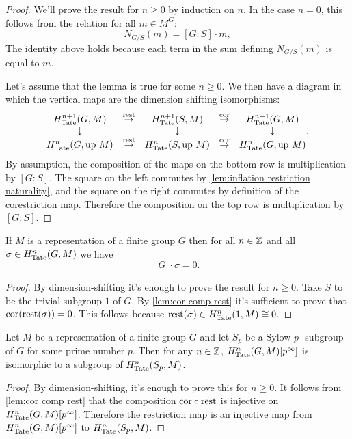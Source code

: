 \begin{proof}
	We'll prove the result for $n \ge 0$ by induction on $n$.
	In the case $n = 0$, this follows from the relation for all $m \in M^G$:
	\[
		N_{G/S} (m) = [G:S] \cdot m,
	\]
	The identity above holds because each term in the sum defining $N_{G/S}(m)$ is equal to $m$.

	Let's assume that the lemma is true for some $n \ge 0$.
	We then have a diagram in which the vertical maps are the dimension shifting isomorphisms:
	\[
		\begin{matrix}
			H^{n+1}_{\mathrm{Tate}}(G, M) & \stackrel{\mathrm{rest}}\to &
			H^{n+1}_{\mathrm{Tate}}(S,M) & \stackrel{\mathrm{cor}}\to & H^{n+1}_{\mathrm{Tate}}(G,M) \\
			\downarrow &&\downarrow &&\downarrow \\
			H^{n}_{\mathrm{Tate}}(G,\mathrm{up}\ M) &  \stackrel{\mathrm{rest}}\to &
			H^{n}_{\mathrm{Tate}}(S,\mathrm{up}\ M) &  \stackrel{\mathrm{cor}}\to & H^{n}_{\mathrm{Tate}}(G,\mathrm{up}\ M)
		\end{matrix}.
	\]
	By assumption, the composition of the maps on the bottom row is multiplication by $[G:S]$.
	The square on the left commutes by \ref{lem:inflation restriction naturality},
	and the square on the right commutes by definition of the corestriction map.
	Therefore the composition on the top row is multiplication by $[G:S]$.
\end{proof}


\begin{corollary} \label{cor:cohomology G-torsion}
	If $M$ is a representation of a finite group $G$ then for
	all $n \in {\mathbb Z}$ and all $\sigma \in H^n_{\mathrm{Tate}}(G,M)$ we have
	\[
		|G| \cdot \sigma = 0.
	\]
\end{corollary}

\begin{proof}
	By dimension-shifting it's enough to prove the result for $n \ge 0$.
	Take $S$ to be the trivial subgroup $1$ of $G$.
	By \ref{lem:cor comp rest} it's sufficient to prove that $\mathrm{cor}(\mathrm{rest}(\sigma))= 0$.
	This follows because $\mathrm{rest}(\sigma) \in H^n_{\mathrm{Tate}}(1,M) \cong 0$.
\end{proof}

\begin{corollary} \label{cor:cohomology sub Sylow}
	Let $M$ be a representation of a finite group $G$ and let $S_p$ be a Sylow $p$-
	subgroup of $G$ for some prime number $p$.
	Then for any $n \in {\mathbb Z}$, $H^n_{\mathrm{Tate}}(G,M)[p^\infty]$ is isomorphic to a subgroup
	of $H^n_{\mathrm{Tate}}(S_p,M)$.
\end{corollary}

\begin{proof}
	By dimension-shifting, it's enough to prove this for $n \ge 0$.
	It follows from \ref{lem:cor comp rest} that the
	composition $\mathrm{cor} \circ \mathrm{rest}$ is injective on $H^n_{\mathrm{Tate}}(G,M)[p^\infty]$.
	Therefore the restriction map is an injective map from $H^n_{\mathrm{Tate}}(G,M)[p^\infty]$
	to $H^n_{\mathrm{Tate}}(S_p,M)$.
\end{proof}











